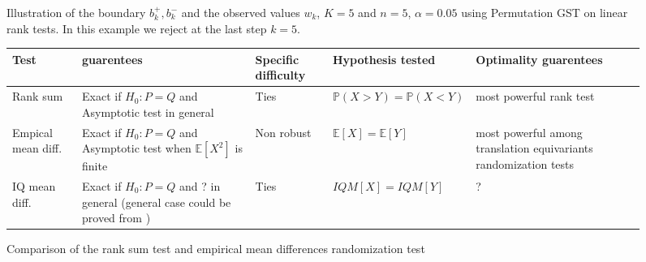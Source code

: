 \documentclass{article}
\theoremstyle{plain}
\theoremstyle{remark}
\renewcommand{\P}{\mathbb{P}}
\newcommand{\E}{\mathbb{E}}
\newcommand{\1}{\mathbbm{1}}
\newcommand{\todoT}[1]{\todo[inline,color=blue!40]{{\textbf{T:}~}#1}}
\numberwithin{equation}{section}
\begin{document}
\begin{figure}
\begin{center}

\caption{Illustration of the boundary $b_k^+, b_k^-$ and the observed values $w_k$, $K=5$ and $n=5$, $\alpha=0.05$ using Permutation GST on linear rank tests. In this example we reject at the last step $k=5$. \label{fig:gst}}
\end{center}
\end{figure}
\begin{figure}[h]
\begin{center}
\begin{tabular}{ | L{4em} | L{7em} |  L{5em}| l | L{9em} | } 
\hline
Test & guarentees & Specific difficulty &  Hypothesis tested & Optimality guarentees \\
\hline
Rank sum & Exact if $H_0:P=Q$ and Asymptotic test in general \cite{Janssen_1999,Chung_2013}  & Ties  &  $\P(X>Y) = \P(X<Y)$ & most powerful rank test \cite{Pratt_1981}\\
\hline
Empical mean diff. & Exact if  $H_0:P=Q$ and Asymptotic test when $\E[X^2]$ is finite \cite{Romano_1990,Chung_2013} & Non robust &  $\E[X]=\E[Y] $&most powerful among translation equivariants randomization tests \cite{Pratt_1981}\\
\hline
IQ mean diff. & Exact if  $H_0:P=Q$ and ? in general (general case could be proved from \cite{lehmann2005testing,Chung_2013})& Ties  &  $IQM[X]=IQM[Y] $& ?\\
\hline
\end{tabular}
\end{center}
\caption{Comparison of the rank sum test and empirical mean differences randomization test}
\end{figure}
\end{document}
